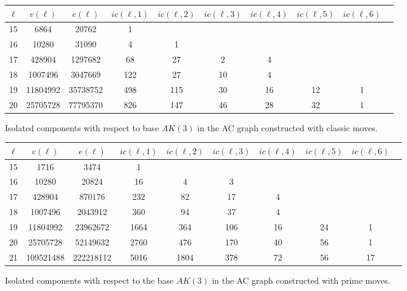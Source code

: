\begin{figure}
	\begin{tabular}{|c|c|c|c|c|c|c|c|c|c|}
		\hline
		$\ell$ & $v(\ell)$ & $e(\ell)$ & $ic(\ell,1)$ & $ic(\ell,2)$ & $ic(\ell,3)$ & $ic(\ell,4)$ & $ic(\ell,5)$ & $ic(\ell,6)$ \\ \hline
		15 & 6864 & 20762 & 1 &  &  &  &  &  \\ \hline
		16 & 10280 & 31090 & 4 & 1 &  &  &  &  \\ \hline
		17 & 428904 & 1297682 & 68 & 27 & 2 & 4 &  &  \\ \hline
		18 & 1007496 & 3047669 & 122 & 27 & 10 & 4 &  &  \\ \hline
		19 & 11804992 & 35738752 & 498 & 115 & 30 & 16 & 12 & 1 \\ \hline
		20 & 25705728 & 77795370 & 826 & 147 & 46 & 28 & 32 & 1 \\ \hline
	\end{tabular}
	\caption{Isolated components with respect to base \(AK(3)\) in the AC graph constructed with classic moves.}
	\label{fig:ak_classic_persistence}
\end{figure}

\begin{figure}
	\begin{tabular}{|c|c|c|c|c|c|c|c|c|c|}
		\hline
		$\ell$ & $v(\ell)$ & $e(\ell)$ & $ic(\ell,1)$ & $ic(\ell,2)$ & $ic(\ell,3)$ & $ic(\ell,4)$ & $ic(\ell,5)$ & $ic(\ell,6)$ \\ \hline
		15 & 1716 & 3474 & 1 &  &  &  &  &  \\ \hline
		16 & 10280 & 20824 & 16 & 4 & 3 &  &  &  \\ \hline
		17 & 428904 & 870176 & 232 & 82 & 17 & 4 &  &  \\ \hline
		18 & 1007496 & 2043912 & 360 & 94 & 37 & 4 &  &  \\ \hline
		19 & 11804992 & 23962672 & 1664 & 364 & 106 & 16 & 24 & 1 \\ \hline
		20 & 25705728 & 52149632 & 2760 & 476 & 170 & 40 & 56 & 1 \\ \hline
		21 & 109521488 & 222218112 & 5016 & 1804 & 378 & 72 & 56 & 17 \\ \hline
	\end{tabular}
	\caption{Isolated components with respect to the base \(AK(3)\) in the AC graph constructed with prime moves.}
	\label{fig:ak_prime_persistence}
\end{figure}

